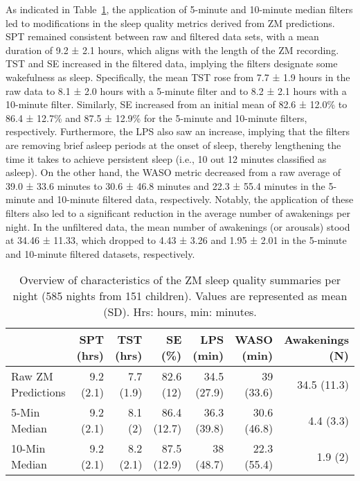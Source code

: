 \documentclass[
  10pt,
]{scrbook}
\begin{document}
As indicated in Table~\ref{tbl-10}, the application of 5-minute and
10-minute median filters led to modifications in the sleep quality
metrics derived from ZM predictions. SPT remained consistent between raw
and filtered data sets, with a mean duration of 9.2 ± 2.1 hours, which
aligns with the length of the ZM recording. TST and SE increased in the
filtered data, implying the filters designate some wakefulness as sleep.
Specifically, the mean TST rose from 7.7 ± 1.9 hours in the raw data to
8.1 ± 2.0 hours with a 5-minute filter and to 8.2 ± 2.1 hours with a
10-minute filter. Similarly, SE increased from an initial mean of 82.6 ±
12.0\% to 86.4 ± 12.7\% and 87.5 ± 12.9\% for the 5-minute and 10-minute
filters, respectively. Furthermore, the LPS also saw an increase,
implying that the filters are removing brief asleep periods at the onset
of sleep, thereby lengthening the time it takes to achieve persistent
sleep (i.e., 10 out 12 minutes classified as asleep). On the other hand,
the WASO metric decreased from a raw average of 39.0 ± 33.6 minutes to
30.6 ± 46.8 minutes and 22.3 ± 55.4 minutes in the 5-minute and
10-minute filtered data, respectively. Notably, the application of these
filters also led to a significant reduction in the average number of
awakenings per night. In the unfiltered data, the mean number of
awakenings (or arousals) stood at 34.46 ± 11.33, which dropped to 4.43 ±
3.26 and 1.95 ± 2.01 in the 5-minute and 10-minute filtered datasets,
respectively.

\begingroup

\footnotesize

\hypertarget{tbl-10}{}
\begin{longtable}{lrrrrrr}
\caption{\label{tbl-10}Overview of characteristics of the ZM sleep quality summaries per night
(585 nights from 151 children). Values are represented as mean (SD).
Hrs: hours, min: minutes. }\tabularnewline

\toprule
 & SPT (hrs) & TST (hrs) & SE (\%) & LPS (min) & WASO (min) & Awakenings (N) \\ 
\midrule
Raw ZM Predictions & 9.2 (2.1) & 7.7 (1.9) & 82.6 (12) & 34.5 (27.9) & 39 (33.6) & 34.5 (11.3) \\ 
5-Min Median & 9.2 (2.1) & 8.1 (2) & 86.4 (12.7) & 36.3 (39.8) & 30.6 (46.8) & 4.4 (3.3) \\ 
10-Min Median & 9.2 (2.1) & 8.2 (2.1) & 87.5 (12.9) & 38 (48.7) & 22.3 (55.4) & 1.9 (2) \\ 
\bottomrule
\end{longtable}
\end{document}
